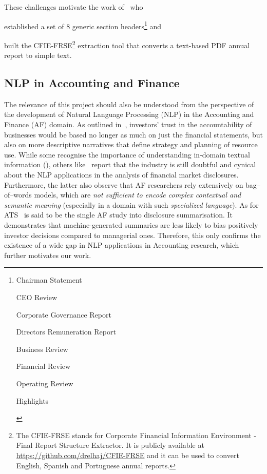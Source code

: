 These challenges motivate the work of~\cite{elhaj2019multilingual} who \begin{enumerate*}[label=(\alph*)]
    \item established a set of 8 generic section headers\footnote{
        \begin{enumerate*}
            \item Chairman Statement
            \item CEO Review
            \item Corporate Governance Report
            \item Directors Remuneration Report
            \item Business Review
            \item Financial Review
            \item Operating Review
            \item Highlights
        \end{enumerate*}
    } and
    \item built the CFIE-FRSE\footnote{
        The CFIE-FRSE stands for Corporate Financial Information Environment - Final Report Structure Extractor.
        It is publicly available at \url{https://github.com/drelhaj/CFIE-FRSE} and it can be used to convert English, Spanish and Portuguese annual reports.
    } extraction tool that converts a text-based PDF annual report to simple text.
\end{enumerate*}

\subsection{NLP in Accounting and Finance}\label{subsec:nlp-in-accounting-and-finance}
The relevance of this project should also be understood from the perspective of the development of Natural Language Processing (NLP) in the Accounting and Finance (AF) domain.
As outlined in~\cite{elliott1998accounting}, investors’ trust in the accountability of businesses would be based no longer as much on just the financial statements, but also on more descriptive narratives that define strategy and planning of resource use.
While some recognise the importance of understanding in-domain textual information (\cite{li2010textual}), others like~\cite{el-haj2019meaning} report that the industry is still doubtful and cynical about the NLP applications in the analysis of financial market disclosures.
Furthermore, the latter also observe that AF researchers rely extensively on bag--of--words models, which are \emph{not sufficient to encode complex contextual and semantic meaning} (especially in a domain with such \emph{specialized language}).
As for ATS~\cite{hollander-white-af} is said to be the single AF study into disclosure summarisation.
It demonstrates that machine-generated summaries are less likely to bias positively investor decisions compared to managerial ones.
Therefore, this only confirms the existence of a wide gap in NLP applications in Accounting research, which further motivates our work.

